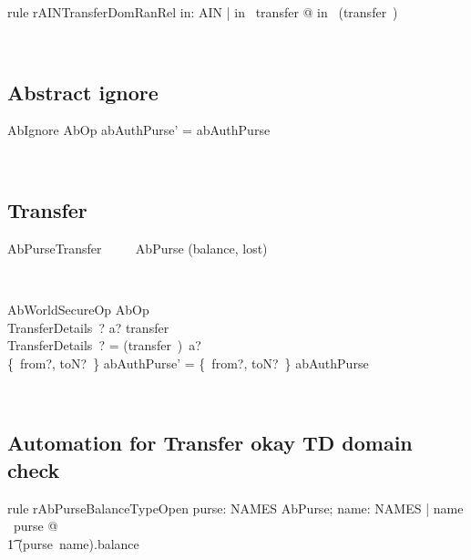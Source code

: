 \begin{LRRT}
\begin{theorem}{rule rAINTransferDomRanRel}
    \forall  in: AIN | in \in  \ran~transfer @ in \in  \dom~(transfer~\inv)
\end{theorem}~\end{LRRT}

\subsection{Abstract ignore}

\begin{LSDef}
\begin{schema}{AbIgnore}
   AbOp
\where
   abAuthPurse' = abAuthPurse
\end{schema}~\end{LSDef}

\subsection{Transfer}

\begin{LSDef}
\begin{zed}
  AbPurseTransfer ~~~~ AbPurse \hide (balance, lost)
\end{zed}~\end{LSDef}

\begin{LSDef}
\begin{schema}{AbWorldSecureOp}
  AbOp\\
  TransferDetails~?
\where
  a? \in  \ran  transfer\\
  \theta  TransferDetails~? = (transfer~\inv)~a?\\
  \{~from?, toN?~\} \ndres  abAuthPurse' = \{~from?, toN?~\} \ndres  abAuthPurse
\end{schema}~\end{LSDef}

\subsection*{Automation for Transfer okay TD domain check}


\begin{LRRT}
\begin{theorem}{rule rAbPurseBalanceTypeOpen}
    \forall  purse: NAMES \ffun AbPurse; name: NAMES | name \in \dom~purse @ \\
        \t1 (purse~name).balance \in \nat
\end{theorem}~\end{LRRT}

